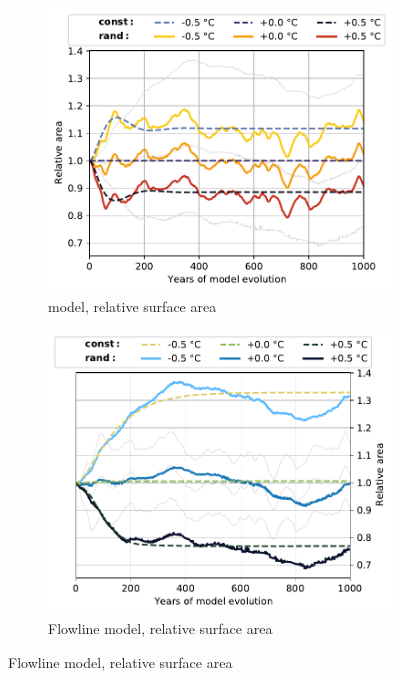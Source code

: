\begin{figure}[p]
      \begin{subfigure}[b]{0.476\textwidth}
        \caption{\Vas{} model, relative surface area}
        \label{fig:hintereisferner:area_vas}
        \centering
        \includegraphics[width=\textwidth]{../plots/final_plots/time_series/single_glaciers/area_norm_vas_Hintereisferner.pdf}
      \end{subfigure}
      \hfill
      \begin{subfigure}[b]{0.476\textwidth}
        \caption{Flowline model, relative surface area}
        \label{fig:hintereisferner:area_fl}
        \centering
        \includegraphics[width=\textwidth]{../plots/final_plots/time_series/single_glaciers/area_norm_fl_Hintereisferner.pdf}
      \end{subfigure}


\end{figure}
